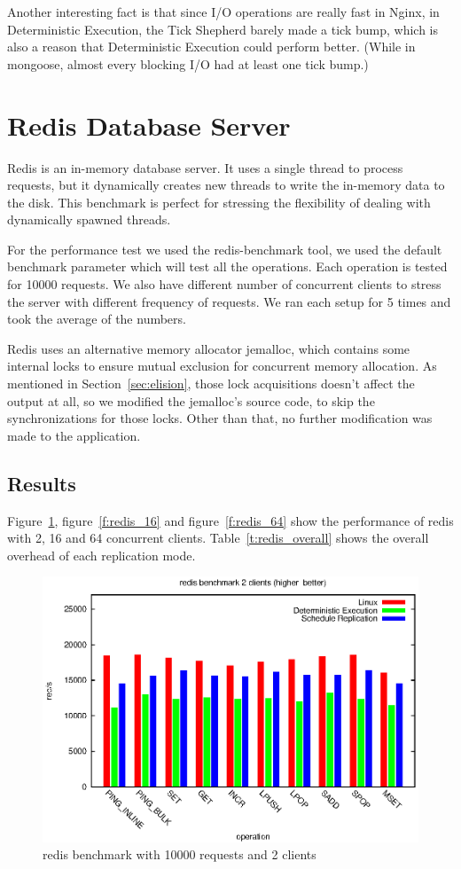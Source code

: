 Another interesting fact is that since I/O operations are really fast in Nginx, in Deterministic Execution, the Tick Shepherd barely made a tick bump, which is also a reason that Deterministic Execution could perform better. (While in mongoose, almost every blocking I/O had at least one tick bump.)

\section{Redis Database Server}
Redis is an in-memory database server. It uses a single thread to process requests, but it dynamically creates new threads to write the in-memory data to the disk. This benchmark is perfect for stressing the flexibility of dealing with dynamically spawned threads.

For the performance test we used the redis-benchmark tool, we used the default benchmark parameter which will test all the operations. Each operation is tested for 10000 requests. We also have different number of concurrent clients to stress the server with different frequency of requests. We ran each setup for 5 times and took the average of the numbers.

Redis uses an alternative memory allocator jemalloc, which contains some internal locks to ensure mutual exclusion for concurrent memory allocation. As mentioned in Section~\ref{sec:elision}, those lock acquisitions doesn't affect the output at all, so we modified the jemalloc's source code, to skip the synchronizations for those locks. Other than that, no further modification was made to the application.

\subsection{Results}
Figure~\ref{f:redis_2}, figure~\ref{f:redis_16} and figure~\ref{f:redis_64} show the  performance of redis with 2, 16 and 64 concurrent clients. Table~\ref{t:redis_overall} shows the overall overhead of each replication mode. 

\begin{figure}
\centering
\includegraphics[width=0.8\columnwidth]{figures/redis_2}
\caption{redis benchmark with 10000 requests and 2 clients}
\label{f:redis_2}
\end{figure}

